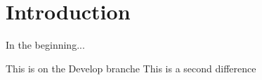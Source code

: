 \documentclass[11pt, a4paper, oneside]{book}
\begin{document}

\frontmatter

\tableofcontents
\mainmatter

\chapter{Introduction}

In the beginning...

This is on the Develop branche
This is a second difference


\end{document}
